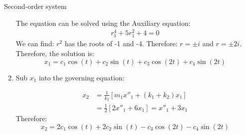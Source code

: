 \begin{exmp}{Second-order system}
\begin{enumerate}
The equation can be solved using the Auxiliary equation:
 \begin{align*}
r_1^{4}+5r_1^{2}+4=0
\end{align*}
We can find: $r^2$ has the roots of -1 and -4. Therefore: $r=\pm i$ and $r=\pm 2i$. Therefore, the solution is:
\begin{equation*}
\boxed{x_1=c_1\cos(t)+c_2\sin(t)+c_3\cos(2t)+c_4\sin(2t)}
\end{equation*}


\item Sub $x_1$ into the governing equation:

 \begin{align*}
x_2&=\frac{1}{k_2}\left[m_1x''_1 +\left(k_1+k_2\right)x_1\right]\\
&=\frac{1}{2}\left[2x''_1 +6x_1\right]=x''_1 +3x_1
\end{align*}
Therefore:
\begin{equation*}
\boxed{x_2=2c_1\cos(t)+2c_2\sin(t)-c_3\cos(2t)-c_4\sin(2t)}
\end{equation*}







\end{enumerate}


\end{exmp}

